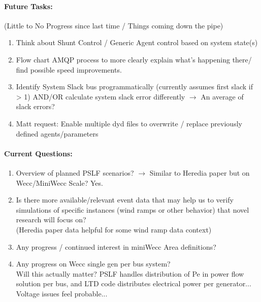 \documentclass[12pt]{article}
\begin{document}
\begin{multicols}{2}
\paragraph{Future Tasks:}(Little to No Progress since last time / Things coming down the pipe)
	\begin{enumerate}
		\item Think about Shunt Control / Generic Agent control based on system state(s)

		\item Flow chart AMQP process to more clearly explain what's happening there/ find possible speed improvements.

		\item Identify System Slack bus programmatically (currently assumes first slack if > 1)
		\subitem AND/OR calculate system slack error differently $\rightarrow$ An average of slack errors?

		\item Matt request: Enable multiple dyd files to overwrite / replace previously defined agents/parameters
		
		
	\end{enumerate}
	\paragraph{Current Questions:}
	\begin{enumerate}
		
		\item Overview of planned PSLF scenarios? $\rightarrow$ Similar to Heredia paper but on Wecc/MiniWecc Scale? Yes.
		
		\item Is there more available/relevant event data that may help us to verify simulations of specific instances (wind ramps or other behavior) that novel research will focus on?\\ (Heredia paper data helpful for some wind ramp data context)

		\item  Any progress / continued interest in miniWecc Area definitions?

		\item Any progress on Wecc single gen per bus system?
		\\ Will this actually matter? PSLF handles distribution of Pe in power flow solution per bus, and LTD code distributes electrical power per generator... Voltage issues feel probable...
		
		
	\end{enumerate}

\vfill\null

\end{multicols}
\end{document}
